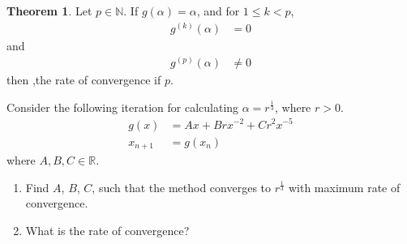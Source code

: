 \documentclass[fleqn, a4paper, 12pt, twoside]{article}
\theoremstyle{definition}
\theoremstyle{theorem}
\newtheorem{theorem}{Theorem}
\begin{document}
\begin{theorem}
	Let $p \in \mathbb{N}$.
	If $g(\alpha) = \alpha$, and for $1 \le k < p$,
	\begin{align*}
		g^{(k)}(\alpha) & = 0
	\end{align*}
	and
	\begin{align*}
		g^{(p)}(\alpha) & \neq 0
	\end{align*}
	then ,the rate of convergence if $p$.
\end{theorem}

\begin{question}
	Consider the following iteration for calculating $\alpha = r^{\frac{1}{3}}$, where $r > 0$.
	\begin{align*}
		g(x)      & = A x + B r x^{-2} + C r^2 x^{-5} \\
		x_{n + 1} & = g(x_n)
	\end{align*}
	where $A,B,C \in \mathbb{R}$.
	\begin{enumerate}
		\item Find $A$, $B$, $C$, such that the method converges to $r^{\frac{1}{3}}$ with maximum rate of convergence.
		\item What is the rate of convergence?
	\end{enumerate}
\end{question}
\end{document}
